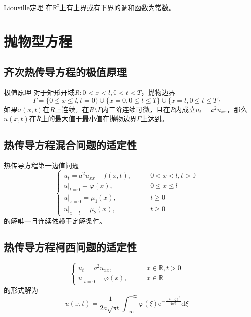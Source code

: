 \documentclass[lang = cn, scheme = chinese, thmcnt = section]{elegantbook}
\newcommand{\R}{\mathbb{R}}            %
\newcommand{\dd}{\mathrm{d}}           %
\newcommand{\ee}[1]{\mathrm{e}^{#1}}   %
\begin{document}
\begin{theorem}{Liouville定理}
	在$\R^2$上有上界或有下界的调和函数为常数。
\end{theorem}

\chapter{抛物型方程}

\section{齐次热传导方程的极值原理}

\begin{theorem}{极值原理}
	对于矩形开域$R:0<x<l,0<t<T$，抛物边界%
	$$
	\Gamma=
	\{ 0\le x\le l,t=0 \}\cup
	\{ x=0,0\le t\le T \}\cup
	\{ x=l,0\le t\le T \}
	$$
	如果$u(x,t)$在$\overline{R}$上连续，在$\overline{R}\setminus \Gamma$内二阶连续可微，且在$R$内成立$u_t=a^2u_{xx}$，那么$u(x,t)$在$\overline{R}$上的最大值于最小值在抛物边界$\Gamma$上达到。
\end{theorem}

\section{热传导方程混合问题的适定性}

\begin{theorem}
	热传导方程第一边值问题%
	$$
	\begin{cases}
		u_{t}=a^2u_{xx}+f(x,t),\qquad & 0<x<l,t>0\\
		u|_{t=0}=\varphi(x),\qquad & 0\le x\le l\\
		u|_{x=0}=\mu_1(x),\qquad & t\ge 0\\
		u|_{x=l}=\mu_2(x),\qquad & t\ge 0
	\end{cases}
	$$
	的解唯一且连续依赖于定解条件。
\end{theorem}

\section{热传导方程柯西问题的适定性}

\begin{theorem}
	$$
	\begin{cases}
		u_t=a^2u_{xx},\qquad & x\in\R,t>0\\
		u|_{t=0}=\varphi(x),\qquad & x\in\R
	\end{cases}
	$$
	的形式解为%
	$$
	u(x,t)=\frac{1}{2a\sqrt{\pi t}}\int_{-\infty}^{+\infty}\varphi(\xi)\ee{-\frac{(x-\xi)^2}{4a^2t}}\dd \xi
	$$
\end{theorem}
\end{document}
